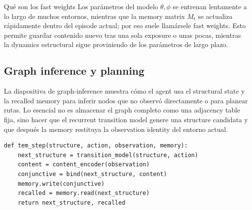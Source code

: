 

\begin{knowledgebox}{Qué son los fast weights}
Los parámetros del modelo $\theta,\phi$ se entrenan lentamente a lo largo de muchos entornos, mientras que la memory matrix $M_t$ se actualiza rápidamente dentro del episode actual; por eso suele llamársele fast weights. Esto permite guardar contenido nuevo tras una sola exposure o unas pocas, mientras la dynamics estructural sigue proviniendo de los parámetros de largo plazo.
\end{knowledgebox}

\subsection{Graph inference y planning}

La diapositiva de graph-inference muestra cómo el agent usa el structural state y la recalled memory para inferir nodos que no observó directamente o para planear rutas. Lo esencial no es almacenar el graph completo como una adjacency table fija, sino hacer que el recurrent transition model genere una structure candidata y que después la memory restituya la observation identity del entorno actual.


\begin{lstlisting}[caption={Flujo conceptual del estado estructural y la vinculación rápida}]
def tem_step(structure, action, observation, memory):
    next_structure = transition_model(structure, action)
    content = content_encoder(observation)
    conjunctive = bind(next_structure, content)
    memory.write(conjunctive)
    recalled = memory.read(next_structure)
    return next_structure, recalled
\end{lstlisting}


